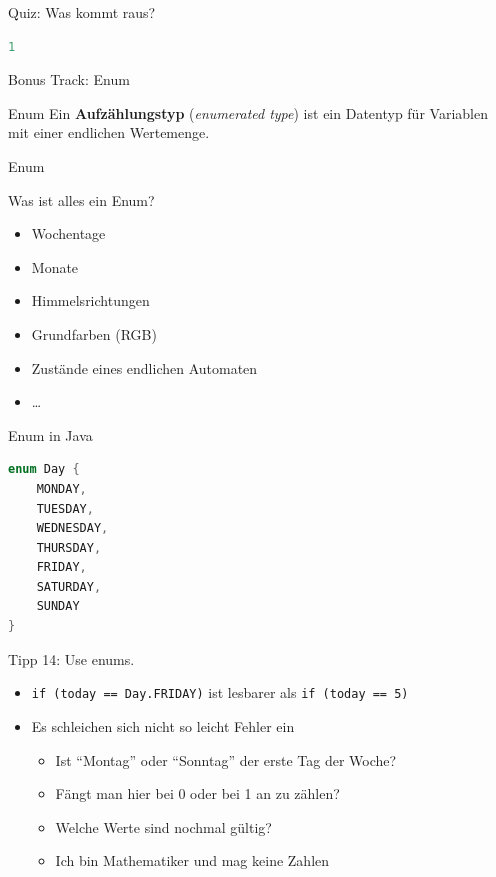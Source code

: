 \documentclass[18pt]{beamer}
\newcommand{\quotes}[1]{``#1''}
\begin{document}
\begin{frame}[fragile]{Quiz: Was kommt raus?}
    \begin{block}{}
        \begin{lstlisting}[language=Java]
1
        \end{lstlisting}
    \end{block}
\end{frame}

\appendix

\beginbackup

\begin{frame}{Bonus Track: Enum}
    \begin{block}{Enum}
        Ein \textbf{Aufzählungstyp} (\textit{enumerated type}) ist ein Datentyp für Variablen mit einer endlichen Wertemenge.
    \end{block}
\end{frame}

\begin{frame}{Enum}
    \begin{exampleblock}{Was ist alles ein Enum?}
        \begin{itemize}
            \item Wochentage
            \item Monate
            \item Himmelsrichtungen
            \item Grundfarben (RGB)
            \item Zustände eines endlichen Automaten
            \item \dots
        \end{itemize}
    \end{exampleblock}
\end{frame}

\begin{frame}[fragile]{Enum in Java}
    \begin{lstlisting}[language=Java]
enum Day {
    MONDAY,
    TUESDAY,
    WEDNESDAY,
    THURSDAY,
    FRIDAY,
    SATURDAY,
    SUNDAY
}
    \end{lstlisting}
\end{frame}

\begin{frame}{Tipp 14: Use enums.}
    \begin{itemize}
        \item \texttt{if (today == Day.FRIDAY)} ist lesbarer als \texttt{if (today == 5)}
        \item Es schleichen sich nicht so leicht Fehler ein
        \begin{itemize}
            \item Ist \quotes{Montag} oder \quotes{Sonntag} der erste Tag der Woche?
            \item Fängt man hier bei 0 oder bei 1 an zu zählen?
            \item Welche Werte sind nochmal gültig?
            \item Ich bin Mathematiker und mag keine Zahlen
        \end{itemize}
    \end{itemize}
\end{frame}
\end{document}
